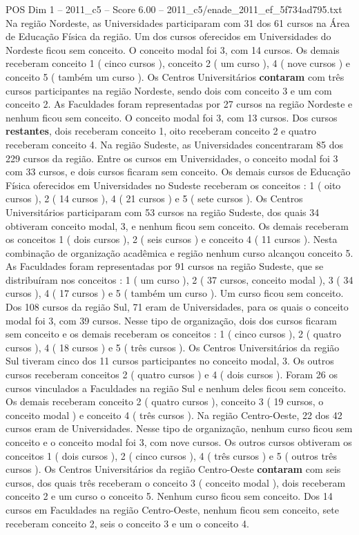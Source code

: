 \begin{textsample}{POS Dim 1 – 2011\_c5 – Score 6.00 – 2011\_c5/enade\_2011\_ef\_5f734ad795.txt}
Na região Nordeste, as Universidades participaram com 31 dos 61 cursos na Área de Educação Física da região.
Um dos cursos oferecidos em Universidades do Nordeste ficou sem conceito.
O conceito modal foi 3, com 14 cursos.
Os demais receberam conceito 1 ( cinco cursos ), conceito 2 ( um curso ), 4 ( nove cursos ) e conceito 5 ( também um curso ).
Os Centros Universitários \textbf{contaram} com três cursos participantes na região Nordeste, sendo dois com conceito 3 e um com conceito 2.
As Faculdades foram representadas por 27 cursos na região Nordeste e nenhum ficou sem conceito.
O conceito modal foi 3, com 13 cursos.
Dos cursos \textbf{restantes}, dois receberam conceito 1, oito receberam conceito 2 e quatro receberam conceito 4.
Na região Sudeste, as Universidades concentraram 85 dos 229 cursos da região.
Entre os cursos em Universidades, o conceito modal foi 3 com 33 cursos, e dois cursos ficaram sem conceito.
Os demais cursos de Educação Física oferecidos em Universidades no Sudeste receberam os conceitos : 1 ( oito cursos ), 2 ( 14 cursos ), 4 ( 21 cursos ) e 5 ( sete cursos ).
Os Centros Universitários participaram com 53 cursos na região Sudeste, dos quais 34 obtiveram conceito modal, 3, e nenhum ficou sem conceito.
Os demais receberam os conceitos 1 ( dois cursos ), 2 ( seis cursos ) e conceito 4 ( 11 cursos ).
Nesta combinação de organização acadêmica e região nenhum curso alcançou conceito 5.
As Faculdades foram representadas por 91 cursos na região Sudeste, que se distribuíram nos conceitos : 1 ( um curso ), 2 ( 37 cursos, conceito modal ), 3 ( 34 cursos ), 4 ( 17 cursos ) e 5 ( também um curso ).
Um curso ficou sem conceito.
Dos 108 cursos da região Sul, 71 eram de Universidades, para os quais o conceito modal foi 3, com 39 cursos.
Nesse tipo de organização, dois dos cursos ficaram sem conceito e os demais receberam os conceitos : 1 ( cinco cursos ), 2 ( quatro cursos ), 4 ( 18 cursos ) e 5 ( três cursos ).
Os Centros Universitários da região Sul tiveram cinco dos 11 cursos participantes no conceito modal, 3.
Os outros cursos receberam conceitos 2 ( quatro cursos ) e 4 ( dois cursos ).
Foram 26 os cursos vinculados a Faculdades na região Sul e nenhum deles ficou sem conceito.
Os demais receberam conceito 2 ( quatro cursos ), conceito 3 ( 19 cursos, o conceito modal ) e conceito 4 ( três cursos ).
Na região Centro-Oeste, 22 dos 42 cursos eram de Universidades.
Nesse tipo de organização, nenhum curso ficou sem conceito e o conceito modal foi 3, com nove cursos.
Os outros cursos obtiveram os conceitos 1 ( dois cursos ), 2 ( cinco cursos ), 4 ( três cursos ) e 5 ( outros três cursos ).
Os Centros Universitários da região Centro-Oeste \textbf{contaram} com seis cursos, dos quais três receberam o conceito 3 ( conceito modal ), dois receberam conceito 2 e um curso o conceito 5.
Nenhum curso ficou sem conceito.
Dos 14 cursos em Faculdades na região Centro-Oeste, nenhum ficou sem conceito, sete receberam conceito 2, seis o conceito 3 e um o conceito 4.

\end{textsample}
